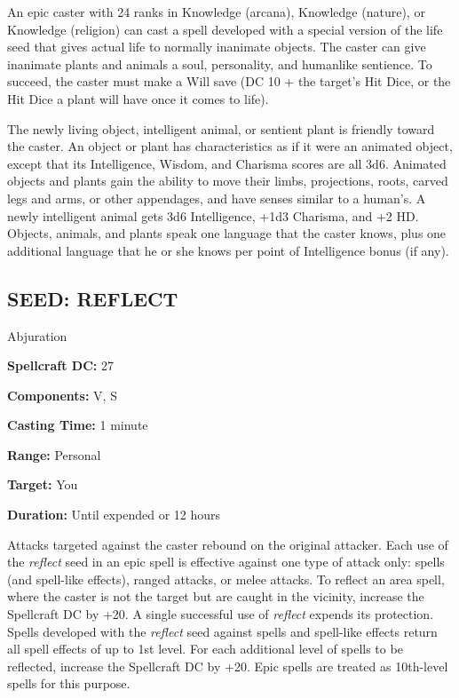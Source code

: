 \documentclass{article}
\begin{document}
An epic caster with 24 ranks in Knowledge (arcana), Knowledge (nature), or Knowledge 
(religion) can cast a spell developed with a special version of the life seed that 
gives actual life to normally inanimate objects. The caster can give inanimate 
plants and animals a soul, personality, and humanlike sentience. To succeed, the 
caster must make a Will save (DC 10 + the target's Hit Dice, or the Hit Dice a 
plant will have once it comes to life).

The newly living object, intelligent animal, or sentient plant is friendly toward 
the caster. An object or plant has characteristics as if it were an animated object, 
except that its Intelligence, Wisdom, and Charisma scores are all 3d6. Animated 
objects and plants gain the ability to move their limbs, projections, roots, carved 
legs and arms, or other appendages, and have senses similar to a human's. A newly 
intelligent animal gets 3d6 Intelligence, +1d3 Charisma, and +2 HD. Objects, animals, 
and plants speak one language that the caster knows, plus one additional language 
that he or she knows per point of Intelligence bonus (if any). 

\vspace{12pt}
\subsection*{SEED: REFLECT }

Abjuration 

\textbf{Spellcraft DC:} 27 

\textbf{Components:} V, S 

\textbf{Casting Time:} 1 minute 

\textbf{Range:} Personal 

\textbf{Target:} You 

\textbf{Duration:} Until expended or 12 hours 

Attacks targeted against the caster rebound on the original attacker. Each use 
of the \textit{reflect }seed in an epic spell is effective against one type of 
attack only: spells (and spell-like effects), ranged attacks, or melee attacks. 
To reflect an area spell, where the caster is not the target but are caught in 
the vicinity, increase the Spellcraft DC by +20. A single successful use of \textit{reflect 
}expends its protection. Spells developed with the \textit{reflect }seed against 
spells and spell-like effects return all spell effects of up to 1st level. For 
each additional level of spells to be reflected, increase the Spellcraft DC by 
+20. Epic spells are treated as 10th-level spells for this purpose. 
\end{document}
